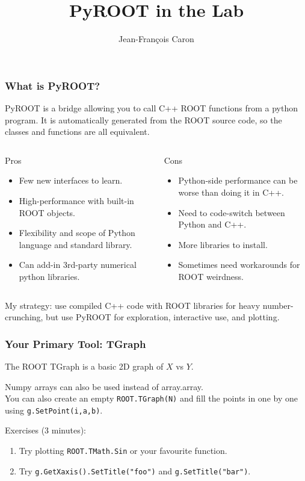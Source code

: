 \documentclass{beamer}
\author[J.-F. Caron]{Jean-Fran\c{c}ois Caron}
\title{PyROOT in the Lab}
\institute{Queen's University}
\begin{document}
\lstset{language=Python, showstringspaces=false, commentstyle=\ttfamily}
\begin{frame}
\titlepage
\end{frame}

\begin{frame}\frametitle{What is PyROOT?}
PyROOT is a bridge allowing you to call C++ ROOT functions from a python program. It is automatically generated from the ROOT source code, so the classes and functions are all equivalent.

\begin{columns}[T]
\begin{column}{0.5\textwidth}
Pros
\begin{itemize}
\item Few new interfaces to learn.
\item High-performance with built-in ROOT objects.
\item Flexibility and scope of Python language and standard library.
\item Can add-in 3rd-party numerical python libraries.
\end{itemize} 
\end{column}

\begin{column}{0.5\textwidth}
Cons
\begin{itemize}
\item Python-side performance can be worse than doing it in C++.
\item Need to code-switch between Python and C++.
\item More libraries to install.
\item Sometimes need workarounds for ROOT weirdness.
\end{itemize}
\end{column}
\end{columns}
\vspace{0.2cm}

My strategy: use compiled C++ code with ROOT libraries for heavy number-crunching, but use PyROOT for exploration, interactive use, and plotting. 

\end{frame}

\begin{frame}\frametitle{Your Primary Tool: TGraph}
The ROOT TGraph is a basic 2D graph of $X$ vs $Y$.

Numpy arrays can also be used instead of array.array.\\
You can also create an empty \lstinline$ROOT.TGraph(N)$ and fill the points in one by one using \lstinline$g.SetPoint(i,a,b)$.

\small{
Exercises (3 minutes):
\begin{enumerate}
\item Try plotting \lstinline$ROOT.TMath.Sin$ or your favourite function.
\item Try \lstinline$g.GetXaxis().SetTitle("foo")$ and \lstinline$g.SetTitle("bar")$.
\end{enumerate}
}
\label{demo_tgraph}
\end{frame}
\end{document}
